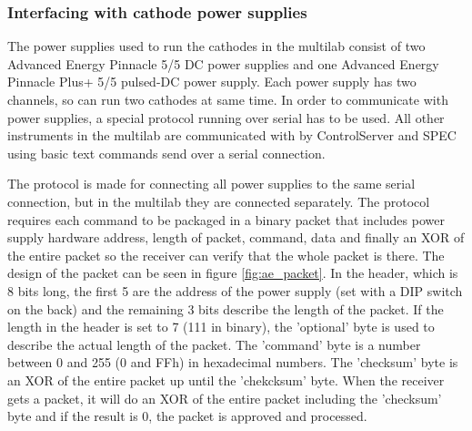 \subsubsection{Interfacing with cathode power supplies}
The power supplies used to run the cathodes in the multilab consist of two Advanced Energy Pinnacle 5/5 DC power supplies and one Advanced Energy Pinnacle Plus+ 5/5 pulsed-DC power supply. Each power supply has two channels, so can run two cathodes at same time. In order to communicate with power supplies, a special protocol running over serial has to be used. All other instruments in the multilab are communicated with by ControlServer and SPEC using basic text commands send over a serial connection.

The protocol is made for connecting all power supplies to the same serial connection, but in the multilab they are connected separately. The protocol requires each command to be packaged in a binary packet that includes power supply hardware address, length of packet, command, data and finally an XOR of the entire packet so the receiver can verify that the whole packet is there. The design of the packet can be seen in figure \ref{fig:ae_packet}. In the header, which is 8 bits long, the first 5 are the address of the power supply (set with a DIP switch on the back) and the remaining 3 bits describe the length of the packet. If the length in the header is set to 7 (111 in binary), the 'optional' byte is used to describe the actual length of the packet. The 'command' byte is a number between 0 and 255 (0 and FFh) in hexadecimal numbers. The 'checksum' byte is an XOR of the entire packet up until the 'chekcksum' byte. When the receiver gets a packet, it will do an XOR of the entire packet including the 'checksum' byte and if the result is 0, the packet is approved and processed.

